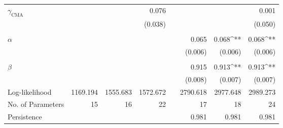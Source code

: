 \begin{table}
\begin{tabularx}{\textwidth}{@{}l ddd X ddd @{}}
    \\
    $\gamma_\text{CMA}$ & & & 0.076 && & & 0.001 \\
    & & & (0.038) && & & (0.050) \\
    \\
    $\alpha$ & & & && 0.065 & 0.068^{**} & 0.068^{**} \\
    & & & && (0.006) & (0.006) & (0.006) \\
    \\
    $\beta$ & & & && 0.915 & 0.913^{**} & 0.913^{**} \\
    & & & && (0.008) & (0.007) & (0.007) \\
    \midrule
    Log-likelihood & 1169.194 & 1555.683 & 1572.672 && 2790.618 & 2977.648 & 2989.273 \\
    No. of Parameters & 15 & 16 & 22 && 17 & 18 & 24 \\
    Persistence & & & && 0.981 & 0.981 & 0.981 \\
    \bottomrule
  \end{tabularx}
\end{table}
